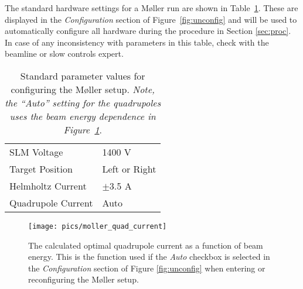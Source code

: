 \documentclass[amsmath,amssymb,notitlepage,12pt]{revtex4}
\begin{document}
The standard hardware settings for a M{\o}ller run are shown in Table~\ref{tab:pars}.  These are displayed in the {\em Configuration} section of Figure~\ref{fig:unconfig} and will be used to automatically configure all hardware during the procedure in Section \ref{sec:proc}.  In case of any inconsistency with parameters in this table, check with the beamline or slow controls expert.

\begin{table}[htbp]\centering
    \begin{tabular}{ll}\toprule[1.5pt]
        SLM Voltage & 1400 V \\
        Target Position & Left or Right \\
        Helmholtz Current & $\pm$3.5 A \\
        Quadrupole Current & Auto \\
        \bottomrule[1.5pt]
    \end{tabular}
    \caption{Standard parameter values for configuring the M{\o}ller setup. {\em  Note, the ``Auto'' setting for the quadrupoles uses the beam energy dependence in Figure~\ref{fig:quadenergy}}.\label{tab:pars}}
\end{table}

\begin{figure}[htbp]\centering
    \texttt{[image: pics/moller\_quad\_current]}
    \caption{The calculated optimal quadrupole current as a function of beam energy.  This is the function used if the {\em Auto} checkbox is selected in the {\em Configuration} section of Figure \ref{fig:unconfig} when entering or reconfiguring the M{\o}ller setup.\label{fig:quadenergy}}
\end{figure}
\end{document}
